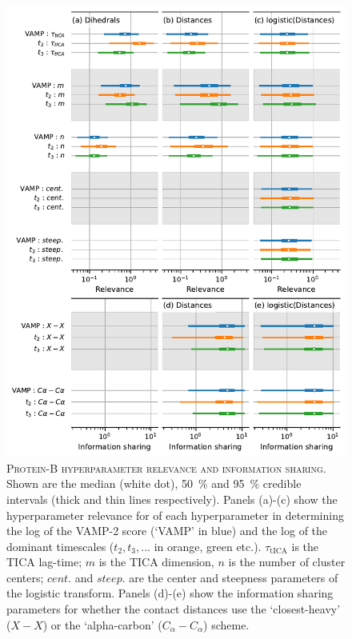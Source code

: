 \documentclass{article}
\begin{document}
\begin{figure}
    \centering
    \includegraphics[height=0.8\textheight]{figures/sensitivities/prb_sensitivity.pdf}
    \caption{\textsc{Protein-B hyperparameter relevance and information sharing}. Shown are the  median (white dot), \SI{50}{\percent} and \SI{95}{\percent} credible intervals (thick and thin lines respectively).  Panels (a)-(c) show the hyperparameter relevance for of each hyperparameter in determining the log of the VAMP-2 score (`VAMP' in blue) and the log of the dominant timescales ($t_{2}, t_{3}, ...$ in orange, green etc.). $\tau_{\mathrm{tICA}}$ is the TICA lag-time; $m$ is the TICA dimension, $n$ is the number of cluster centers; $cent.$ and $steep.$ are the center and steepness parameters of the logistic transform. Panels (d)-(e) show the information sharing parameters for whether the contact distances use the `closest-heavy' ($X-X$) or the `alpha-carbon' ($C_{\alpha}-C_{\alpha}$) scheme.  }
    \label{fig:prb_sense}
\end{figure}
\end{document}
